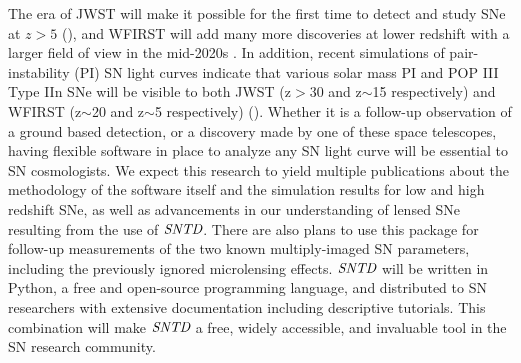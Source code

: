 


 The era of JWST will make it possible for the first time to detect and study SNe 
 at $z>5$ (\cite{Mesinger:2006}), and WFIRST will add many more discoveries at lower redshift 
 with a larger field of view in the mid-2020s . 
In addition, recent simulations of pair-instability (PI) SN light curves indicate
that various solar mass PI and POP III Type IIn SNe will be visible to
both JWST (z$>$30 and z$\sim$15 respectively) and WFIRST (z$\sim$20
and z$\sim$5 respectively) (\cite{Magg:2016}). Whether it is a follow-up observation
of a ground based detection, or a discovery made by one of these space
telescopes, having flexible software in place to analyze any SN light
curve will be essential to SN cosmologists. We expect this research to
yield multiple publications about the methodology of the software
itself and the simulation results for low and high redshift SNe, as
well as advancements in our understanding of lensed SNe resulting from
the use of $\textit{SNTD}$. There are also plans to use this package
for follow-up measurements of the two known multiply-imaged SN
parameters, including the previously ignored microlensing
effects. $\textit{SNTD}$ will be written in Python, a free and
open-source programming language, and distributed to SN researchers
with extensive documentation including descriptive tutorials. This
combination will make $\textit{SNTD}$ a free, widely accessible, and
invaluable tool in the SN research community.  
